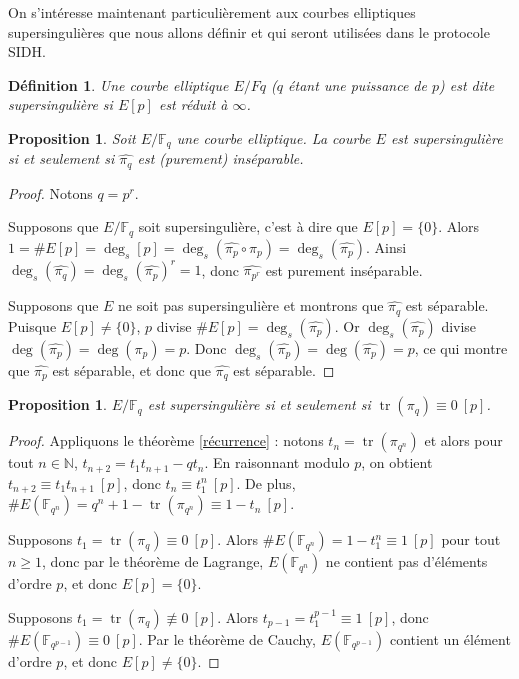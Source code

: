 \documentclass{article}
\theoremstyle{plain}%
\newtheorem{prop}[thm]{Proposition}
\newtheorem{deff}[thm]{Définition}
\theoremstyle{definition}%
\newcommand{\F}{\mathbb{F}}
\newcommand{\N}{\mathbb{N}}
\newcommand{\h}{\widehat}
\DeclareMathOperator{\tr}{tr}
\begin{document}
On s'intéresse maintenant particulièrement aux courbes elliptiques supersingulières que nous allons définir et qui seront utilisées dans le protocole SIDH.

\begin{deff}
  Une courbe elliptique $E/Fq$ ($q$ étant une puissance de $p$) est dite supersingulière si $E[p]$ est réduit à $\infty$. 
\end{deff}
\begin{prop}
  \label{pihatsep}
  Soit $E/\F_q$ une courbe elliptique. La courbe $E$ est supersingulière si et seulement si $\widehat{\pi_q}$ est (purement) inséparable.
\end{prop}

\begin{proof}
  Notons $q = p^r$. 

  Supposons que $E/\F_q$ soit supersingulière, c'est à dire que $E[p] = \{0\}$. Alors $1 = \#E[p] = \deg_s[p] = \deg_s(\h{\pi_{p}} \circ \pi_{p}) = \deg_s(\h{\pi_{p}})$. Ainsi $\deg_s(\h{\pi_{q}}) =  \deg_s(\h{\pi_{p}})^r= 1$, donc $\h{\pi_{p^r}}$ est purement inséparable.

  Supposons que $E$ ne soit pas supersingulière et montrons que $\h{\pi_{q}}$ est séparable. Puisque $E[p] \neq \{0\}$, $p$ divise $\#E[p] = \deg_s(\h{\pi_p})$. Or $\deg_s(\h{\pi_p})$ divise $\deg(\h{\pi_p}) = \deg({\pi_p}) = p$. Donc $\deg_s(\h{\pi_p}) = \deg(\h{\pi_p}) =p$, ce qui montre que $\h{\pi_p}$ est séparable, et donc que $\h{\pi_q}$ est séparable.
\end{proof}

\begin{prop}
  \label{pimodp}
  $E/\F_q$ est supersingulière si et seulement si $\tr(\pi_q) \equiv 0\ [p]$. 
\end{prop}

\begin{proof}
  Appliquons le théorème \ref{récurrence} : 
  notons $t_n = \tr(\pi_{q^n})$ 
  et alors pour tout $n\in\N$, 
  $t_{n+2} = t_1 t_{n+1} -qt_n$.
  En raisonnant modulo $p$, on obtient $t_{n+2} \equiv t_1 t_{n+1}\ [p]$, donc $t_n \equiv t_1^n\ [p]$. 
  De plus, $\#E(\F_{q^n}) = q^n + 1 - \tr(\pi_{q^n}) \equiv 1 - t_n\ [p]$.

Supposons $t_1 = \tr(\pi_q) \equiv 0\ [p]$. 
Alors $\#E(\F_{q^n}) = 1 - t_1^n \equiv 1\ [p]$ pour tout $n \ge 1$, donc par le théorème de Lagrange, $E(\F_{q^n})$ ne contient pas d’éléments d’ordre $p$, et donc $E[p] = \{0\}$.

Supposons $t_1 = \tr(\pi_q) \not\equiv 0\ [p]$. 
Alors $t_{p-1} = t_1^{p-1} \equiv 1\ [p]$, donc $\#E(\F_{q^{p-1}}) \equiv 0\ [p]$. Par le théorème de Cauchy, $E(\F_{q^{p-1}})$ contient un élément d’ordre $p$, et donc $E[p] \neq  \{0\}$.
\end{proof}
\end{document}
